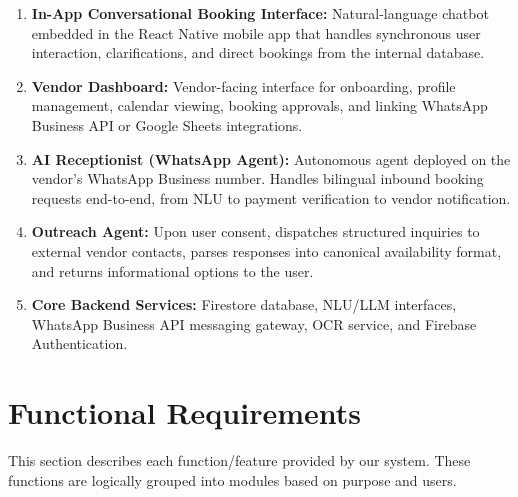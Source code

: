 \begin{enumerate}
  \item \textbf{In-App Conversational Booking Interface:} Natural-language chatbot
        embedded in the React Native mobile app that handles synchronous user
        interaction, clarifications, and direct bookings from the internal database.
  \item \textbf{Vendor Dashboard:} Vendor-facing interface for onboarding, profile
        management, calendar viewing, booking approvals, and linking WhatsApp Business
        API or Google Sheets integrations.
  \item \textbf{AI Receptionist (WhatsApp Agent):} Autonomous agent deployed on the
        vendor's WhatsApp Business number.  Handles bilingual inbound booking requests
        end-to-end, from NLU to payment verification to vendor notification.
  \item \textbf{Outreach Agent:} Upon user consent, dispatches structured inquiries
        to external vendor contacts, parses responses into canonical availability
        format, and returns informational options to the user.
  \item \textbf{Core Backend Services:} Firestore database, NLU/LLM interfaces,
        WhatsApp Business API messaging gateway, OCR service, and Firebase
        Authentication.
\end{enumerate}

\section{Functional Requirements}

This section describes each function/feature provided by our system.  These
functions are logically grouped into modules based on purpose and users.

